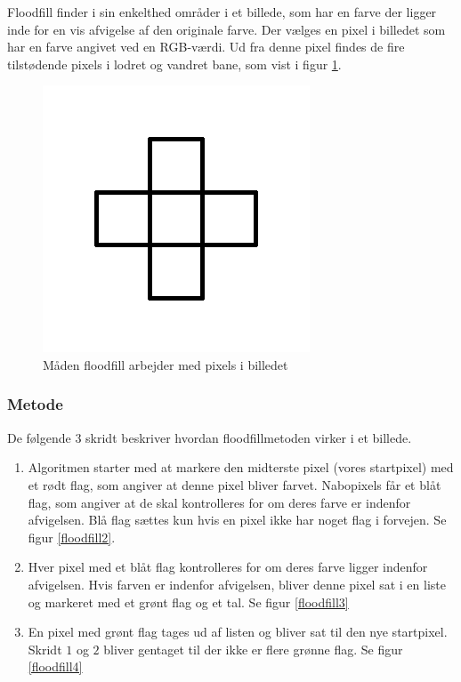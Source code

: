 {

Floodfill finder i sin enkelthed områder i et billede, som har en farve
der ligger inde for en vis afvigelse af den originale farve. Der vælges
en pixel i billedet som har en farve angivet ved en RGB-værdi. Ud fra
denne pixel findes de fire tilstødende pixels i lodret og vandret bane,
som vist i figur \ref{floodfill1}.

\begin{figure}[!h]
    \begin{center}
        \includegraphics[scale=0.42,angle=0]{afsnit/vores_implementation/billeder/flood_fill/floodfill1}
    \end{center}
    \caption[]{Måden floodfill arbejder med pixels i billedet}
    \label{floodfill1}
\end{figure}

\subsubsection{Metode}
De følgende 3 skridt beskriver hvordan floodfillmetoden virker i et
billede.

\begin{enumerate}
    \item Algoritmen starter med at markere den midterste pixel (vores
        startpixel) med et rødt flag, som angiver at denne pixel bliver
        farvet. Nabopixels får et blåt flag, som angiver at de skal
        kontrolleres for om deres farve er indenfor afvigelsen. Blå flag
        sættes kun hvis en pixel ikke har noget flag i forvejen. Se
        figur \ref{floodfill2}.
    \item Hver pixel med et blåt flag kontrolleres for om deres
        farve ligger indenfor afvigelsen. Hvis farven er indenfor
        afvigelsen, bliver denne pixel sat i en liste og markeret med et
        grønt flag og et tal. Se figur \ref{floodfill3}
    \item En pixel med grønt flag tages ud af listen og bliver sat til
        den nye startpixel. Skridt $1$ og $2$ bliver gentaget til der
        ikke er flere grønne flag. Se figur \ref{floodfill4}
\end{enumerate}

}

